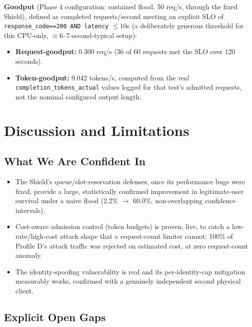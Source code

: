 \documentclass[11pt]{article}
\begin{document}
\textbf{Goodput} (Phase 4 configuration: sustained flood, 50 req/s, through
the fixed Shield), defined as completed requests/second meeting an explicit
SLO of \texttt{response\_code==200 AND latency} $\leq 10$s (a deliberately
generous threshold for this CPU-only, $\approx$6--7-second-typical setup):

\begin{itemize}
    \item \textbf{Request-goodput:} 0.300 req/s (36 of 60 requests met the SLO
    over 120 seconds).
    \item \textbf{Token-goodput:} 9.042 tokens/s, computed from the
    \emph{real} \texttt{completion\_tokens\_actual} values logged for that
    test's admitted requests, not the nominal configured output length.
\end{itemize}

\section{Discussion and Limitations}

\subsection{What We Are Confident In}

\begin{itemize}
    \item The Shield's queue/slot-reservation defenses, once its performance
    bugs were fixed, provide a large, statistically confirmed improvement in
    legitimate-user survival under a naive flood (2.2\% $\to$ 60.0\%,
    non-overlapping confidence intervals).
    \item Cost-aware admission control (token budgets) is proven, live, to
    catch a low-rate/high-cost attack shape that a request-count limiter
    cannot: 100\% of Profile D's attack traffic was rejected on estimated
    cost, at zero request-count anomaly.
    \item The identity-spoofing vulnerability is real and its
    per-identity-cap mitigation measurably works, confirmed with a genuinely
    independent second physical client.
\end{itemize}

\subsection{Explicit Open Gaps}
\end{document}
